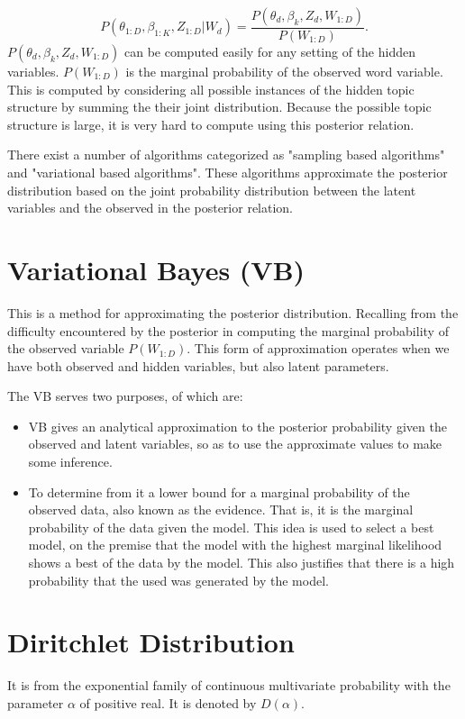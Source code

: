 $$P(\theta_{1:D},\beta_{1:K},Z_{1:D}|W_d)=\frac{P(\theta_d,\beta_k,Z_d,W_{1:D})}{P(W_{1:D})}\text{.}$$
$P(\theta_d,\beta_k,Z_d,W_{1:D})$ can be computed easily for any setting of the hidden variables. $P(W_{1:D})$ is the marginal probability of the observed word variable. This is computed by considering all possible instances of the hidden topic structure by summing the their joint distribution. Because the possible topic structure is large, it is very hard to compute using this posterior relation.

There exist a number of algorithms categorized as "sampling based algorithms" and "variational based algorithms". These algorithms approximate the posterior distribution based on the joint probability distribution between the latent variables and the observed in the posterior relation.

\section{Variational Bayes (VB)}
This is a method for approximating the posterior distribution. Recalling from the difficulty encountered by the posterior in computing the marginal probability of the observed variable $P(W_{1:D})$. This form of approximation operates when we have both observed and hidden variables, but also latent parameters.

The VB serves two purposes, of which are:
\begin{itemize}
\item VB gives an analytical approximation to the posterior probability given the observed and latent variables, so as to use the approximate values to make some inference.
\item To determine from it a lower bound for a marginal probability of the observed data, also known as the evidence. That is, it is the marginal probability of the data given the model. 
This idea is used to select a best model, on the premise that the model with the highest marginal likelihood shows a best of the data by the model. This also justifies that there is a high probability that the used was generated by the model.
\end{itemize}
\section{Diritchlet Distribution}
It is from the exponential family of continuous multivariate probability with the parameter $\alpha$ of positive real. It is denoted by $D(\alpha)$.

